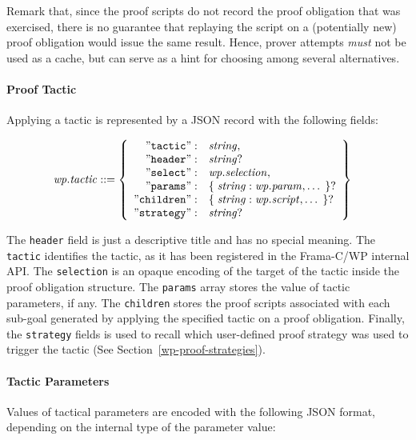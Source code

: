 Remark that, since the proof scripts do not record the proof obligation that was exercised, there is no
guarantee that replaying the script on a (potentially new) proof obligation would issue the same result.
Hence, prover attempts \emph{must} not be used as a cache, but can serve as a hint for choosing among
several alternatives.

\paragraph{Proof Tactic} Applying a tactic is represented by a \textsf{JSON} record with the following
fields:

\begin{align*}
    \mathit{wp.tactic} &::=
    \left\{
    \begin{array}{rl}
        \mathtt{"tactic"}   :& \mathit{string}, \\
        \mathtt{"header"}   :& \mathit{string} ? \\
        \mathtt{"select"}   :& \mathit{wp.selection}, \\
        \mathtt{"params"}   :& \mathtt{\{}\; \mathit{string}:\mathit{wp.param} ,\ldots \;\mathtt{\}} ? \\
        \mathtt{"children"} :& \mathtt{\{}\; \mathit{string}:\mathit{wp.script}, \ldots \;\mathtt{\}} ? \\
        \mathtt{"strategy"} :& \mathit{string} ? \\
    \end{array}
    \right\}
\end{align*}

The \verb"header" field is just a descriptive title and has no special
meaning. The \verb"tactic" identifies the tactic, as it has been registered in
the \textsf{Frama-C/WP} internal API.  The \verb"selection" is an opaque
encoding of the target of the tactic inside the proof obligation structure. The
\verb"params" array stores the value of tactic parameters, if any.  The
\verb"children" stores the proof scripts associated with each sub-goal generated
by applying the specified tactic on a proof obligation. Finally, the
\verb"strategy" fields is used to recall which user-defined proof strategy was
used to trigger the tactic (See Section~\ref{wp-proof-strategies}).

\paragraph{Tactic Parameters} Values of tactical parameters are encoded with the
following \textsf{JSON} format, depending on the internal type of the parameter
value:

